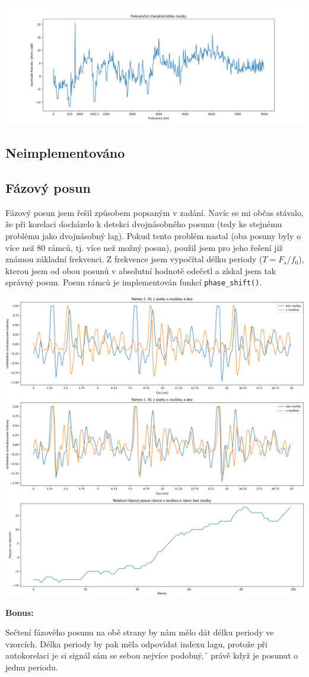 \documentclass[12pt]{article}
\begin{document}
\hspace{-4.5em}\includegraphics[scale=0.55]{ukol6.png}
\subsection{Neimplementováno}
\newpage
\subsection{Fázový posun}
\hspace{1.5em}Fázový posun jsem řešil způsobem popsaným v zadání. Navíc se mi občas stávalo, že při korelaci docházelo k detekci dvojnásobného posunu (tedy ke stejnému problému jako dvojnásobný lag). Pokud tento problém nastal (oba posuny byly o více než $80$ rámců, tj. více než možný posun), použil jsem pro jeho řešení již známou základní frekvenci. Z frekvence jsem vypočítal délku periody ($T=F_s/f_0$), kterou jsem od obou posunů v absolutní hodnotě odečetl a získal jsem tak správný posun. Posun rámců je implementován funkcí \texttt{phase\_shift()}.

\vspace{1em}
\includegraphics[scale=0.43]{ukol15.png}

\textbf{Bonus:}

\hspace{1.5em}Sečtení fázového posunu na obě strany by nám mělo dát délku periody ve vzorcích. Délka periody by pak měla odpovídat indexu lagu, protože při autokorelaci je si signál sám se sebou nejvíce podobný,´ právě když je posunut o jednu periodu.
\end{document}
